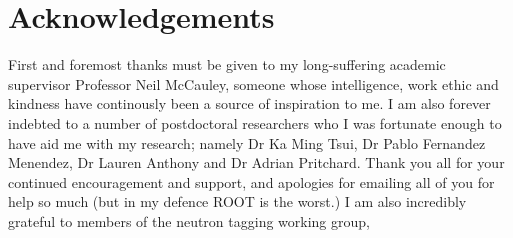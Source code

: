 \chapter*{Acknowledgements}
\thispagestyle{empty}

First and foremost thanks must be given to my long-suffering academic supervisor Professor Neil McCauley, someone whose intelligence, work ethic and kindness have continously been a source of inspiration to me. 
\newline
I am also forever indebted to a number of postdoctoral researchers who I was fortunate enough to have aid me with my research; namely Dr Ka Ming Tsui, Dr Pablo Fernandez Menendez, Dr Lauren Anthony and Dr Adrian Pritchard. Thank you all for your continued encouragement and support, and apologies for emailing all of you for help so much (but in my defence ROOT is the worst.)
\newline
I am also incredibly grateful to members of the neutron tagging working group, 